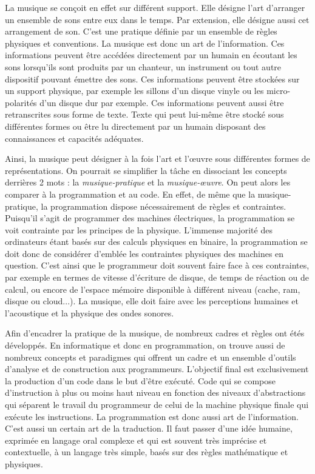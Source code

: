 \documentclass[12pt]{article} %
\begin{document}
La musique se conçoit en effet sur différent support. Elle désigne l'art d'arranger un ensemble de sons entre eux dans le temps. Par extension, elle désigne aussi cet arrangement de son. C'est une pratique définie par un ensemble de règles physiques et conventions. La musique est donc un art de l'information. Ces informations peuvent être accédées directement par un humain en écoutant les sons lorsqu'ils sont produits par un chanteur, un instrument ou tout autre dispositif pouvant émettre des sons. Ces informations peuvent être stockées sur un support physique, par exemple les sillons d'un disque vinyle ou les micro-polarités d'un disque dur par exemple. Ces informations peuvent aussi être retranscrites sous forme de texte. Texte qui peut lui-même être stocké sous différentes formes ou être lu directement par un humain disposant des connaissances et capacités adéquates. 

Ainsi, la musique peut désigner à la fois l'art et l'œuvre sous différentes formes de représentations. On pourrait se simplifier la tâche en dissociant les concepts derrières 2 mots : la \textit{musique-pratique} et la \textit{musique-œuvre}. On peut alors les comparer à la programmation et au code. En effet, de même que la musique-pratique, la programmation dispose nécessairement de règles et contraintes. Puisqu'il s'agit de programmer des machines électriques, la programmation se voit contrainte par les principes de la physique. L'immense majorité des ordinateurs étant basés sur des calculs physiques en binaire, la programmation se doit donc de considérer d'emblée les contraintes physiques des machines en question. C'est ainsi que le programmeur doit souvent faire face à ces contraintes, par exemple en termes de vitesse d'écriture de disque, de temps de réaction ou de calcul, ou encore de l'espace mémoire disponible à différent niveau (cache, \acrshort{ram}, disque ou cloud...). La musique, elle doit faire avec les perceptions humaines et l'acoustique et la physique des ondes sonores. 

Afin d'encadrer la pratique de la musique, de nombreux cadres et règles ont étés développés. En informatique et donc en programmation, on trouve aussi de nombreux concepts et paradigmes qui offrent un cadre et un ensemble d'outils d'analyse et de construction aux programmeurs. L'objectif final est exclusivement la production d'un code dans le but d'être exécuté. Code qui se compose d'instruction à plus ou moins haut niveau en fonction des niveaux d'abstractions qui séparent le travail du programmeur de celui de la machine physique finale qui exécute les instructions. La programmation est donc aussi art de l'information. C'est aussi un certain art de la traduction. Il faut passer d'une idée humaine, exprimée en langage oral complexe et qui est souvent très imprécise et contextuelle, à un langage très simple, basés sur des règles mathématique et physiques. 
\end{document}

